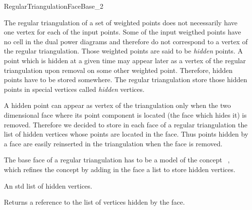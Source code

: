 

\begin{ccRefConcept}{RegularTriangulationFaceBase_2}


\ccDefinition
  
The regular triangulation of a set of weighted points does not
necessarily
have one vertex for each of the input points. Some of the input
weigthed points have no cell in the dual power diagrams
and therefore do not correspond to a vertex of the regular
triangulation.
Those weighted points are said to be {\it hidden} points.
A  point which is hidden at a given time may appear later as a vertex of
the regular triangulation upon removal on some other weighted point.
Therefore, hidden points have to be stored somewhere.
The regular triangulation store those hidden points
in special vertices called {\it hidden} vertices.

A hidden point can appear as vertex of the triangulation
only when the
two dimensional face where its point component is located
(the face which hides it)
is removed. Therefore we decided to store 
in each  face of a regular triangulation
the list of hidden vertices whose points are located in the face.
Thus  points hidden by a face are easily reinserted in the triangulation
when the face is removed.

The base face of a regular triangulation 
has to be a model
of the concept \ccRefName\ , which refines
the concept  by adding
in the face  a list to store hidden vertices.

\ccRefines
{}

\ccTypes
{}
{An std list of hidden vertices.}




{Returns a reference to the list of vertices hidden by the face.}


\ccHasModels
{}

\ccSeeAlso
{} \\

\end{ccRefConcept}


